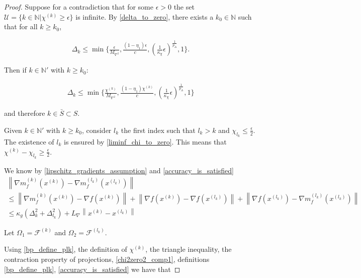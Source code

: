 \documentclass{article}
\theoremstyle{case}
\newcommand{\chik}{{\chi^{(k)}}}
\newcommand{\dk}{\Delta_k}
\newcommand{\feasiblek}{{\mathcal F^{(k)}}}
\newcommand{\gk}{{\nabla m_f^{(k)}(x^{(k)})}}
\newcommand{\gradf}{\nabla f}
\newcommand{\lipgrad}{{L_{\nabla}}}
\newcommand{\maxhessian}{{M_{\nabla^2}}}
\newcommand{\naturals}{\mathbb N}
\newcommand{\xk}{{x^{(k)}}}
\begin{document}
\begin{proof}
Suppose for a contradiction that for some $\epsilon > 0$ the set $\mathcal U = \{k \in \naturals | \chik \ge \epsilon \}$ is infinite.
By \cref{delta_to_zero}, there exists a $k_0 \in \naturals$ such that for all $k \ge k_0$,

\begin{align*}
\dk \le \min\{\frac{\epsilon}{\maxhessian}, \frac{(1-\eta_1)\epsilon}{c}, \left(\frac 1 {\kappa_{\chi}}  \epsilon \right)^{\frac 1 {p_{\Delta}}}, 1\}.
\end{align*}

Then if $k \in \naturals '$ with $k \ge k_0$:

\begin{align*}
\dk \le \min\{\frac{\chik}{\maxhessian}, \frac{(1-\eta_1)\chik}{c}, \left(\frac 1 {\kappa_{\chi}}  \epsilon \right)^{\frac 1 {p_{\Delta}}}, 1\}
\end{align*}

and therefore $k \in \bar S \subset S$.

Given $k \in \naturals'$ with $k\ge k_0$, consider $l_k$ the first index such that $l_k > k$ and $\chi_{l_k} \le \frac{\epsilon} 2$.
The existence of $l_k$ is ensured by \cref{liminf_chi_to_zero}.
This means that $\chik - \chi_{l_k} \ge \frac {\epsilon} 2 $.

We know by \cref{lipschitz_gradients_assumption} and \cref{accuracy_is_satisfied}
\begin{align}
\left\|\gk - {\nabla m_f^{(l_k)}\left(x^{(l_k)}\right)}\right\| \nonumber \\
\le \left\|\gk - \gradf(\xk)\right\| + \left\|\gradf(\xk) - \gradf(x^{(l_k)})\right\| + \left\|\gradf(x^{(l_k)}) - {\nabla m_f^{(l_k)}\left(x^{(l_k)}\right)}\right\| \nonumber \\
\le \kappa_g \left(\dk^2 + \Delta_{l_k}^2\right) + \lipgrad \left\|\xk - x^{(l_k)} \right\| \label{chi2zero2_comp1}
\end{align}


Let $\Omega_1 = \feasiblek$ and $\Omega_2 = \mathcal F^{(l_k)}$.

Using \cref{bp_define_plk}, the definition of $\chik$, the triangle inequality, the contraction property of projections, \cref{chi2zero2_comp1},
definitions \cref{bp_define_plk}, \cref{accuracy_is_satisfied} we have that


\end{proof}
\end{document}
